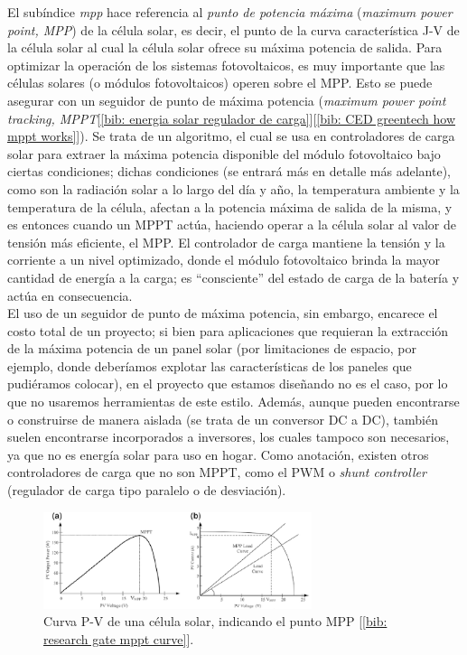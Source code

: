 \documentclass[12pt]{article}
\begin{document}
	\noindent El subíndice \textit{mpp} hace referencia al \textit{punto de potencia máxima} (\textit{maximum power point, MPP}) de la célula solar, es decir, el punto de la curva característica J-V de la célula solar al cual la célula solar ofrece su máxima potencia de salida.  Para optimizar la operación de los sistemas fotovoltaicos, es muy importante que las células solares (o módulos fotovoltaicos) operen sobre el MPP. Esto se puede asegurar con un seguidor de punto de máxima potencia (\textit{maximum power point tracking, MPPT}[\ref{bib: energia solar regulador de carga}][\ref{bib: CED greentech how mppt works}]). Se trata de un algoritmo, el cual se usa en controladores de carga solar para extraer la máxima potencia disponible del módulo fotovoltaico bajo ciertas condiciones; dichas condiciones (se entrará más en detalle más adelante), como son la radiación solar a lo largo del día y año, la temperatura ambiente y la temperatura de la célula, afectan a la potencia máxima de salida de la misma, y es entonces cuando un MPPT actúa, haciendo operar a la célula solar al valor de tensión más eficiente, el MPP. El controlador de carga mantiene la tensión y la corriente a un nivel optimizado, donde el módulo fotovoltaico brinda la mayor cantidad de energía a la carga; es ``consciente'' del estado de carga de la batería y actúa en consecuencia. \\
	
	\noindent El uso de un seguidor de punto de máxima potencia, sin embargo, encarece el costo total de un proyecto; si bien para aplicaciones que requieran la extracción de la máxima potencia de un panel solar (por limitaciones de espacio, por ejemplo, donde deberíamos explotar las características de los paneles que pudiéramos colocar), en el proyecto que estamos diseñando no es el caso, por lo que no usaremos herramientas de este estilo. Además, aunque pueden encontrarse o construirse de manera aislada (se trata de un conversor DC a DC), también suelen encontrarse incorporados a inversores, los cuales tampoco son necesarios, ya que no es energía solar para uso en hogar. Como anotación, existen otros controladores de carga que no son MPPT, como el PWM o \textit{shunt controller} (regulador de carga tipo paralelo o de desviación). \\
	
	\begin{figure}[h]
		\begin{center}
			\includegraphics[width=0.7\textwidth]{img/mppt_curve.png}
			\caption{Curva P-V de una célula solar, indicando el punto MPP [\ref{bib: research gate mppt curve}].}
			\label{fig: MPPT in P-V curve of a solar cell}
		\end{center}
	\end{figure}
	
\end{document}
